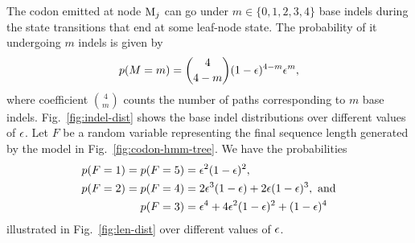 The codon emitted at node $\mathrm{M}_j$ can go under $m\in\{0, 1, 2, 3, 4\}$ base indels during
the state transitions that end at some leaf-node state.
The probability of it undergoing $m$ indels is given by
\begin{equation*}
  p(M=m) = \binom{4}{4-m} (1 - \epsilon)^{4-m} \epsilon^m,
\end{equation*}
where coefficient $\binom{4}{m}$ counts the number of paths corresponding to $m$ base indels.
Fig.~\ref{fig:indel-dist} shows the base indel distributions over different values of $\epsilon$.
Let $F$ be a random variable representing the final sequence length generated by the model in
Fig.~\ref{fig:codon-hmm-tree}.
We have the probabilities
\begin{equation*}
  \begin{split}
    p(F=1) = p(F=5) &= \epsilon^2(1-\epsilon)^2, \\
    p(F=2) = p(F=4) &= 2\epsilon^3(1-\epsilon) + 2\epsilon(1-\epsilon)^3,~\text{and} \\
    p(F=3)          &= \epsilon^4 + 4\epsilon^2(1-\epsilon)^2 + (1-\epsilon)^4
  \end{split}
\end{equation*}
illustrated in Fig.~\ref{fig:len-dist} over different values of $\epsilon$.

